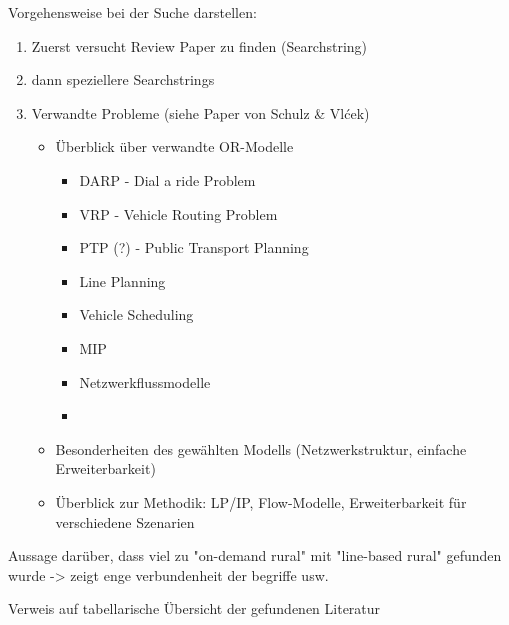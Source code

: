 Vorgehensweise bei der Suche darstellen:
\begin{enumerate}
    \item Zuerst versucht Review Paper zu finden (Searchstring) 
    \item dann speziellere Searchstrings
    \item Verwandte Probleme (siehe Paper von Schulz \& Vlćek)
    \begin{itemize}
        \item Überblick über verwandte OR-Modelle
        \begin{itemize}
            \item DARP - Dial a ride Problem
            \item VRP - Vehicle Routing Problem
            \item PTP (?) - Public Transport Planning
            \item Line Planning
            \item Vehicle Scheduling
            \item MIP
            \item Netzwerkflussmodelle
            \item 
        \end{itemize}
        \item Besonderheiten des gewählten Modells (Netzwerkstruktur, einfache Erweiterbarkeit)
        \item Überblick zur Methodik: LP/IP, Flow-Modelle, Erweiterbarkeit für verschiedene Szenarien
    \end{itemize}
\end{enumerate}

Aussage darüber, dass viel zu "on-demand rural" mit "line-based rural" gefunden wurde -> zeigt enge verbundenheit der begriffe usw.

Verweis auf tabellarische Übersicht der gefundenen Literatur %

